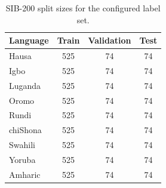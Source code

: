\begin{table}[t]
\centering
\caption{SIB-200 split sizes for the configured label set.}
\label{tab:dataset_stats}
\small
\begin{tabular}{lccc}
\toprule
Language & Train & Validation & Test \\
\midrule
Hausa & 525 & 74 & 74 \\
Igbo & 525 & 74 & 74 \\
Luganda & 525 & 74 & 74 \\
Oromo & 525 & 74 & 74 \\
Rundi & 525 & 74 & 74 \\
chiShona & 525 & 74 & 74 \\
Swahili & 525 & 74 & 74 \\
Yoruba & 525 & 74 & 74 \\
Amharic & 525 & 74 & 74 \\
\bottomrule
\end{tabular}
\end{table}